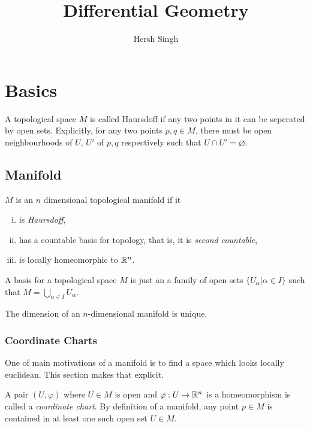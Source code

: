 
\setcounter{secnumdepth}{1}
\title{Differential Geometry}
\author{Hersh Singh}


\maketitle
\chapter{Basics}
\label{cha:basics}
\begin{definition}
    A topological space $M$ is called Haursdoff if any two points in it can be seperated by open sets. Explicitly, for any two points $p,q\in M $, there must be open neighbourhoods of $U,\, U'$ of $p,q$ respectively such that $U\cap U'=\varnothing$.
\end{definition}

\section{Manifold}
\label{sec:manifold_}

$M$ is an $n$ dimensional topological manifold if it 
\begin{enumerate}[(i)]
    \makethislistcompact
    \item is \emph{Haursdoff},
    \item has a countable basis for topology, that is, it is \emph{second countable},
    \item is locally homeomorphic to $\mathbb{R}^n$.\\
\end{enumerate}

A basis for a topological space $M$ is just an a family of open sets $\{U_\alpha|\alpha\in I\}$ such that $M=\bigcup_{\alpha\in I}U_\alpha$.

\begin{insight}
   The dimension of an $n$-dimensional manifold is unique. 
\end{insight}

\subsection{Coordinate Charts}
\label{sub:coordinate_charts}
One of main motivations of a manifold is to find a space which looks locally euclidean. This section makes that explicit.

A pair $(U,\varphi)$ where $U\in M$ is open and $\varphi: U \to \mathbb{R}^n$ is a homeomorphism is called a \emph{coordinate chart}. By definition of a manifold, any point $p\in M$ is contained in at least one such open set $U\in M$.

